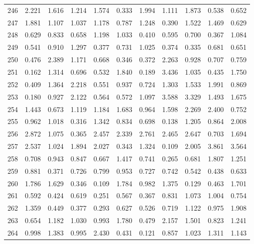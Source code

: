 \begin{tabular}{lrrrrrrrrrr}
246 &  2.221 &  1.616 &  1.214 &  1.574 &  0.333 &  1.994 &  1.111 &  1.873 &  0.538 &  0.652 \\
247 &  1.881 &  1.107 &  1.037 &  1.178 &  0.787 &  1.248 &  0.390 &  1.522 &  1.469 &  0.629 \\
248 &  0.629 &  0.833 &  0.658 &  1.198 &  1.033 &  0.410 &  0.595 &  0.700 &  0.367 &  1.084 \\
249 &  0.541 &  0.910 &  1.297 &  0.377 &  0.731 &  1.025 &  0.374 &  0.335 &  0.681 &  0.651 \\
250 &  0.476 &  2.389 &  1.171 &  0.668 &  0.346 &  0.372 &  2.263 &  0.928 &  0.707 &  0.759 \\
251 &  0.162 &  1.314 &  0.696 &  0.532 &  1.840 &  0.189 &  3.436 &  1.035 &  0.435 &  1.750 \\
252 &  0.409 &  1.364 &  2.218 &  0.551 &  0.937 &  0.724 &  1.303 &  1.533 &  1.991 &  0.869 \\
253 &  0.180 &  0.927 &  2.122 &  0.564 &  0.572 &  1.097 &  3.588 &  3.329 &  1.493 &  1.675 \\
254 &  1.443 &  0.673 &  1.119 &  1.184 &  1.683 &  0.964 &  1.598 &  2.269 &  2.400 &  0.752 \\
255 &  0.962 &  1.018 &  0.316 &  1.342 &  0.834 &  0.698 &  0.138 &  1.205 &  0.864 &  2.008 \\
256 &  2.872 &  1.075 &  0.365 &  2.457 &  2.339 &  2.761 &  2.465 &  2.647 &  0.703 &  1.694 \\
257 &  2.537 &  1.024 &  1.894 &  2.027 &  0.343 &  1.324 &  0.109 &  2.005 &  3.861 &  3.564 \\
258 &  0.708 &  0.943 &  0.847 &  0.667 &  1.417 &  0.741 &  0.265 &  0.681 &  1.807 &  1.251 \\
259 &  0.881 &  0.371 &  0.726 &  0.799 &  0.953 &  0.727 &  0.742 &  0.542 &  0.438 &  0.633 \\
260 &  1.786 &  1.629 &  0.346 &  0.109 &  1.784 &  0.982 &  1.375 &  0.129 &  0.463 &  1.701 \\
261 &  0.592 &  0.424 &  0.619 &  0.251 &  0.567 &  0.367 &  0.831 &  1.073 &  1.004 &  0.754 \\
262 &  1.359 &  0.449 &  0.377 &  0.293 &  0.627 &  0.526 &  0.719 &  1.122 &  0.975 &  1.908 \\
263 &  0.654 &  1.182 &  1.030 &  0.993 &  1.780 &  0.479 &  2.157 &  1.501 &  0.823 &  1.241 \\
264 &  0.998 &  1.383 &  0.995 &  2.430 &  0.431 &  0.121 &  0.857 &  1.023 &  1.311 &  1.143 \\

\end{tabular}
